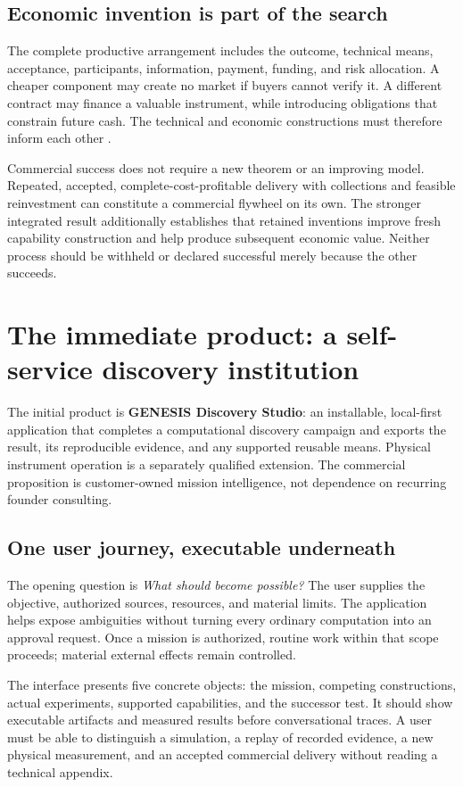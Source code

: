\documentclass[11pt,letterpaper]{article}
\theoremstyle{remark}\newtheorem{remark}{Remark}[section]
\begin{document}
\subsection{Economic invention is part of the search}
The complete productive arrangement includes the outcome, technical means, acceptance, participants, information, payment, funding, and risk allocation. A cheaper component may create no market if buyers cannot verify it. A different contract may finance a valuable instrument, while introducing obligations that constrain future cash. The technical and economic constructions must therefore inform each other \citep{notes30,superalpha,omegapaper}.

Commercial success does not require a new theorem or an improving model. Repeated, accepted, complete-cost-profitable delivery with collections and feasible reinvestment can constitute a commercial flywheel on its own. The stronger integrated result additionally establishes that retained inventions improve fresh capability construction and help produce subsequent economic value. Neither process should be withheld or declared successful merely because the other succeeds.

\section{The immediate product: a self-service discovery institution}
\label{sec:product}
The initial product is \textbf{GENESIS Discovery Studio}: an installable, local-first application that completes a computational discovery campaign and exports the result, its reproducible evidence, and any supported reusable means. Physical instrument operation is a separately qualified extension. The commercial proposition is customer-owned mission intelligence, not dependence on recurring founder consulting.

\subsection{One user journey, executable underneath}
The opening question is \emph{What should become possible?} The user supplies the objective, authorized sources, resources, and material limits. The application helps expose ambiguities without turning every ordinary computation into an approval request. Once a mission is authorized, routine work within that scope proceeds; material external effects remain controlled.

The interface presents five concrete objects: the mission, competing constructions, actual experiments, supported capabilities, and the successor test. It should show executable artifacts and measured results before conversational traces. A user must be able to distinguish a simulation, a replay of recorded evidence, a new physical measurement, and an accepted commercial delivery without reading a technical appendix.
\end{document}
